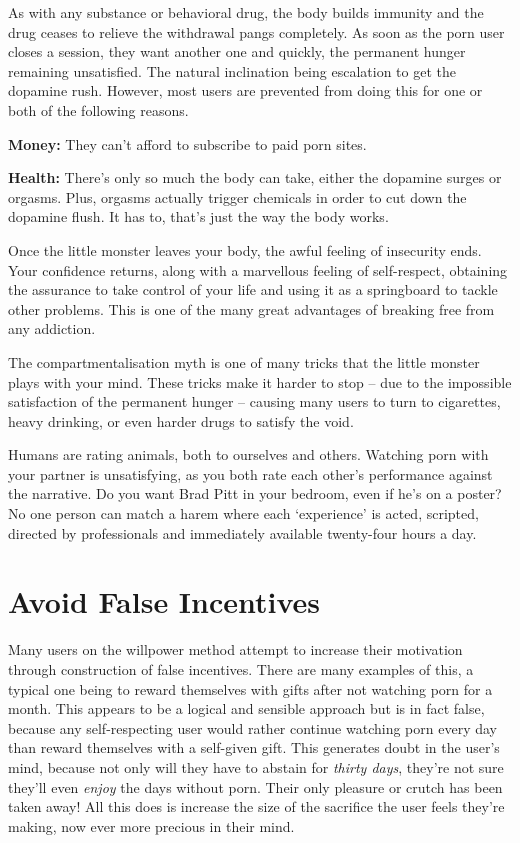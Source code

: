 \documentclass[
]{book}
\begin{document}
As with any substance or behavioral drug, the body builds immunity and the drug ceases to relieve the withdrawal pangs completely. As soon as the porn user closes a session, they want another one and quickly, the permanent hunger remaining unsatisfied. The natural inclination being escalation to get the dopamine rush. However, most users are prevented from doing this for one or both of the following reasons.

\textbf{Money:} They can't afford to subscribe to paid porn sites.

\textbf{Health:} There's only so much the body can take, either the dopamine surges or orgasms. Plus, orgasms actually trigger chemicals in order to cut down the dopamine flush. It has to, that's just the way the body works.

Once the little monster leaves your body, the awful feeling of insecurity ends. Your confidence returns, along with a marvellous feeling of self-respect, obtaining the assurance to take control of your life and using it as a springboard to tackle other problems. This is one of the many great advantages of breaking free from any addiction.

The compartmentalisation myth is one of many tricks that the little monster plays with your mind. These tricks make it harder to stop -- due to the impossible satisfaction of the permanent hunger -- causing many users to turn to cigarettes, heavy drinking, or even harder drugs to satisfy the void.

Humans are rating animals, both to ourselves and others. Watching porn with your partner is unsatisfying, as you both rate each other's performance against the narrative. Do you want Brad Pitt in your bedroom, even if he's on a poster? No one person can match a harem where each `experience' is acted, scripted, directed by professionals and immediately available twenty-four hours a day.

\hypertarget{avoid-false-incentives}{%
\chapter{Avoid False Incentives}\label{avoid-false-incentives}}

Many users on the willpower method attempt to increase their motivation through construction of false incentives. There are many examples of this, a typical one being to reward themselves with gifts after not watching porn for a month. This appears to be a logical and sensible approach but is in fact false, because any self-respecting user would rather continue watching porn every day than reward themselves with a self-given gift. This generates doubt in the user's mind, because not only will they have to abstain for \emph{thirty days}, they're not sure they'll even \emph{enjoy} the days without porn. Their only pleasure or crutch has been taken away! All this does is increase the size of the sacrifice the user feels they're making, now ever more precious in their mind.
\end{document}
